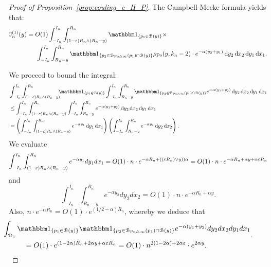 \begin{proof}[Proof of Proposition~\ref{prop:couling_c_H_P}]
The Campbell-Mecke formula yields that: 
\begin{equation*}
\begin{split} 
\mathcal{I}_n^{(1)}(y) 
&=O(1) \int_{-I_n}^{I_n} \int_{(1-\eps) R_n \wedge (R_n-y)}^{R_n} \ind{p_1 \in \BallHyp{y}} \times\\
& \hspace{15pt}\int_{-I_n}^{I_n} \int_{R_n - y}^{R_n} 
\ind{p_2 \in \BallSym{p_1} \cap \BallHyp{y}}
  \rho_{\Po}(y,k_n-2) \cdot
e^{-\alpha( y_2 + y_1)} \dd y_2 \dd x_2 \dd y_1 \dd x_1.
\end{split}
\end{equation*}

We proceed to bound the integral: 
\begin{align*}
	&\int_{-I_n}^{I_n} \int_{(1-\eps) R_n \wedge (R_n-y)}^{R_n} \hspace{-5pt} \ind{p_1 \in \BallHyp{y}}
		\int_{-I_n}^{I_n} \int_{R_n - y}^{R_n } \ind{p_2 \in \BallSym{p_1} \cap \BallHyp{y}} 
		e^{-\alpha(y_1 + y_2)} \dd y_2 \dd x_2 \dd y_1 \dd x_1 \\
	&\leq \int_{-I_n}^{I_n} \int_{(1-\eps) R_n \wedge (R_n-y)}^{R_n} 
		\int_{-I_n}^{I_n} \int_{R_n - y}^{R_n}  e^{-\alpha(y_1 + y_2)} \dd y_2 \dd x_2 \dd y_1 \dd x_1\\
	&= \left( \int_{-I_n}^{I_n} \int_{(1-\eps) R_n \wedge (R_n-y)}^{R_n} e^{- \alpha y_1} \dd y_1 \dd x_1 \right) 
	\left(\int_{-I_n}^{I_n} \int_{R_n - y}^{R_n}  e^{-\alpha y_2} \dd y_2 \dd x_2 \right).
\end{align*}
We evaluate
$$  \int_{-I_n}^{I_n} \int_{(1-\varepsilon) R_n \wedge (R_n-y)}^{R_n} 
e^{- \alpha y_1} dy_1 dx_1= O(1) \cdot n \cdot e^{-\alpha R_n + ((\varepsilon R_n) \vee y))\alpha}
=O(1) \cdot n \cdot e^{-\alpha R_n + \alpha y + \alpha \varepsilon R_n }
$$
and 
$$\int_{-I_n}^{I_n} \int_{R_n - y}^{R_n}  e^{-\alpha y_2} dy_2 dx_2 
=O(1) \cdot n \cdot e^{-\alpha R_n +\alpha y}.
$$
Also, $n \cdot e^{-\alpha R_n} = O(1) \cdot e^{(1/2 -\alpha) R_n}$, whereby we deduce that 
\begin{equation*}
\begin{split}
&\hspace{-30pt}\int_{\dom{1}} \ind{p_1 \in \BallHyp{y}} \ind{p_2 \in \BallSym{p_1} \cap \BallHyp{y}} 
 e^{-\alpha(y_1 + y_2)} dy_2 dx_2 dy_1 dx_1 \\
&=O(1) \cdot e^{(1-2\alpha)R_n + 2\alpha y + \alpha \eps R_n} =O(1) \cdot n^{2(1-2\alpha) + 2\alpha \eps} \cdot e^{2\alpha y}.
\end{split}.
\end{equation*}


\end{proof}
